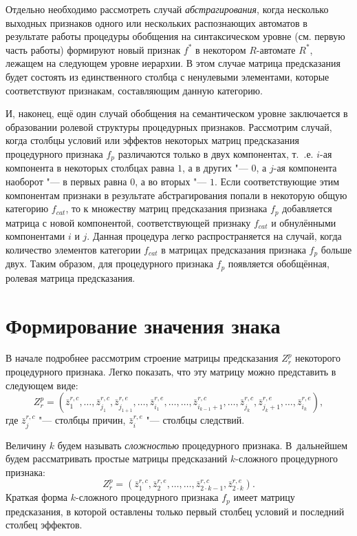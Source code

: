 \documentclass[a4paper, 12pt]{article}
\theoremstyle{plain}
\begin{document}
	Отдельно необходимо рассмотреть случай \textit{абстрагирования}, когда несколько выходных признаков одного или нескольких распознающих автоматов в результате работы процедуры обобщения на синтаксическом уровне (см. первую часть работы) формируют новый признак $f^*$ в некотором $R$-автомате $R^*$, лежащем на следующем уровне иерархии. В этом случае матрица предсказания будет состоять из единственного столбца с ненулевыми элементами, которые соответствуют признакам, составляющим данную категорию.
	
	И, наконец, ещё один случай обобщения на семантическом уровне заключается в образовании ролевой структуры процедурных признаков. Рассмотрим случай, когда столбцы условий или эффектов некоторых матриц предсказания процедурного признака $f_p$ различаются только в двух компонентах, т.~.е. $i$-ая компонента в некоторых столбцах равна $1$, а в других "--- $0$, а $j$-ая компонента наоборот "--- в первых равна $0$, а во вторых "--- $1$. Если соответствующие этим компонентам признаки в результате абстрагирования попали в некоторую общую категорию $f_{cat}$, то к множеству матриц предсказания признака $f_p$ добавляется матрица с новой компонентой, соответствующей признаку $f_{cat}$ и обнулёнными компонентами $i$ и $j$. Данная процедура легко распространяется на случай, когда количество элементов категории $f_{cat}$ в матрицах предсказания признака $f_p$ больше двух. Таким образом, для процедурного признака $f_p$ появляется обобщённая, ролевая матрица предсказания.

	\section{Формирование значения знака} \label{sect:link}
	В начале подробнее рассмотрим строение матрицы предсказания $Z_r^p$ некоторого процедурного признака. Легко показать, что эту матрицу можно представить в следующем виде:
	\begin{equation}
	Z_r^p=(\bar z_1^{r,c},\dots,\bar z_{j_1}^{r,c},\bar z_{j_{1+1}}^{r,e},\dots,\bar z_{i_1}^{r,e},\dots,\dots,\bar z_{i_{k-1}+1}^{r,c},\dots,\bar z_{j_k}^{r,c},\bar z_{j_k+1}^{r,e},\dots,\bar z_{i_k}^{r,e}),
	\end{equation}
	где $\bar z_j^{r,c}$ "--- столбцы причин, $\bar z_i^{r,e}$ "--- столбцы следствий. 
	
	Величину $k$ будем называть \textit{сложностью} процедурного признака. В~дальнейшем будем рассматривать простые матрицы предсказаний $k$-сложного процедурного признака:
	\begin{equation}
	Z_r^p=(\bar z_1^{r,c},\bar z_2^{r,e},\dots,\dots,\bar z_{2\cdot k-1}^{r,c},\bar z_{2\cdot k}^{r,e}).
	\end{equation}
	Краткая форма $k$-сложного процедурного признака $f_p$ имеет матрицу предсказания, в которой оставлены только первый столбец условий и последний столбец эффектов.
	
\end{document}
